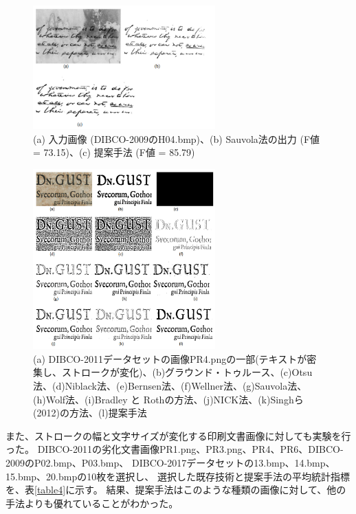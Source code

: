 \documentclass[uplatex, twocolumn,10pt]{jsarticle}
\begin{document}
\begin{figure}[tp]
    \begin{center}
        \includegraphics*[width=7cm]{image/master/Fig4.png}
        \caption{(a) 入力画像 (DIBCO-2009のH04.bmp)、(b) Sauvola法の出力 (F値 = 73.15)、(c) 提案手法 (F値 = 85.79)}
        \label{fig4}
    \end{center}
\end{figure}

\begin{figure}[tp]
    \begin{center}
        \includegraphics*[width=7cm]{image/master/Fig5.png}
        \caption{(a) DIBCO-2011データセットの画像PR4.pngの一部(テキストが密集し、ストロークが変化)、(b)グラウンド・トゥルース、(c)Otsu法、(d)Niblack法、(e)Bernsen法、(f)Wellner法、(g)Sauvola法、(h)Wolf法、(i)Bradley と Rothの方法、(j)NICK法、(k)Singhら(2012)の方法、(l)提案手法}
        \label{fig5}
    \end{center}
\end{figure}

また、ストロークの幅と文字サイズが変化する印刷文書画像に対しても実験を行った。
DIBCO-2011の劣化文書画像PR1.png、PR3.png、PR4、PR6、DIBCO-2009のP02.bmp、P03.bmp、
DIBCO-2017データセットの13.bmp、14.bmp、15.bmp、20.bmpの10枚を選択し、
選択した既存技術と提案手法の平均統計指標を、表\ref{table4}に示す。
結果、提案手法はこのような種類の画像に対して、他の手法よりも優れていることがわかった。
\end{document}

